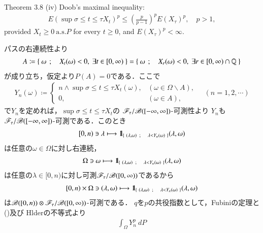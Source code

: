 	\begin{itembox}[l]{Theorem 3.8 (iv)}
		Doob's maximal inequality:
		\begin{align}
			E\left( \sup{\sigma \leq t \leq \tau} X_t \right)^p
			\leq \left( \frac{p}{p-1} \right)^p E\left(X_\tau\right)^p,
			\quad p > 1,
		\end{align}
		provided $X_t \geq 0\ \mbox{a.s.$P$}$ for every $t \geq 0$, and $E\left(X_\tau\right)^p < \infty$.
	\end{itembox}
	
	\begin{prf}
		パスの右連続性より
		\begin{align}
			A \coloneqq \left\{\ \omega\ \, ; \quad X_t(\omega) < 0,\ \exists t \in [0,\infty)\ \right\}
			= \left\{\ \omega\ \, ; \quad X_r(\omega) < 0,\ \exists r \in [0,\infty) \cap \mathbb{Q}\ \right\}
		\end{align}
		が成り立ち，仮定より$P(A) = 0$である．ここで
		\begin{align}
			Y_n(\omega) \coloneqq
			\begin{cases}
				n \wedge \sup{\sigma \leq t \leq \tau}{X_t(\omega)}, & (\omega \in \Omega \backslash A), \\
				0, & (\omega \in A),
			\end{cases}
			\quad (n=1,2,\cdots)
		\end{align}
		で$Y_n$を定めれば，$\sup{\sigma \leq t \leq \tau}{X_t}$の
		$\mathscr{F}_\tau/\mathscr{B}([-\infty,\infty])$-可測性より
		$Y_n$も$\mathscr{F}_\tau/\mathscr{B}([-\infty,\infty])$-可測である．このとき
		\begin{align}
			[0,n) \ni \lambda \longmapsto \mbox{1}\hspace{-0.25em}\mbox{l}_{\left\{\ (\lambda,\omega)\ \, ; \quad \lambda < Y_n(\omega)\ \right\}}(\lambda,\omega)
		\end{align}
		は任意の$\omega \in \Omega$に対し右連続，
		\begin{align}
			\Omega \ni \omega \longmapsto \mbox{1}\hspace{-0.25em}\mbox{l}_{\left\{\ (\lambda,\omega)\ \, ; \quad \lambda < Y_n(\omega)\ \right\}}(\lambda,\omega)
		\end{align}
		は任意の$\lambda \in [0,n)$に対し可測$\mathscr{F}_\tau/\mathscr{B}([0,\infty))$であるから
		\begin{align}
			[0,n) \times \Omega \ni (\lambda,\omega) \longmapsto \mbox{1}\hspace{-0.25em}\mbox{l}_{\left\{\ (\lambda,\omega)\ \, ; \quad \lambda < Y_n(\omega)\ \right\}}(\lambda,\omega)
		\end{align}
		は$\mathscr{B}([0,n)) \otimes \mathscr{F}_\tau/\mathscr{B}([0,\infty))$-可測である．
		$q$を$p$の共役指数として，Fubiniの定理と()及び
		Hlderの不等式より
		\begin{align}
			\int_{\Omega} Y_n^p\ dP

\end{align}
\end{prf}
